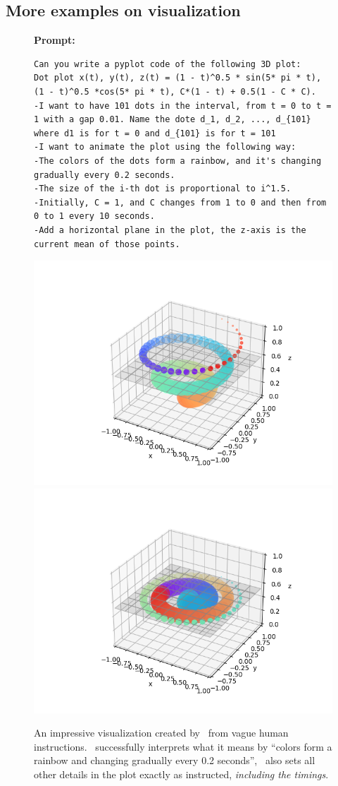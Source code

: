 \subsection{More examples on visualization}
\begin{figure}[H]
\begin{AIbox}{\DV}
{\bf Prompt:} \begin{verbatim}
Can you write a pyplot code of the following 3D plot:
Dot plot x(t), y(t), z(t) = (1 - t)^0.5 * sin(5* pi * t), (1 - t)^0.5 *cos(5* pi * t), C*(1 - t) + 0.5(1 - C * C).
-I want to have 101 dots in the interval, from t = 0 to t = 1 with a gap 0.01. Name the dote d_1, d_2, ..., d_{101} where d1 is for t = 0 and d_{101} is for t = 101
-I want to animate the plot using the following way:
-The colors of the dots form a rainbow, and it's changing gradually every 0.2 seconds.
-The size of the i-th dot is proportional to i^1.5.
-Initially, C = 1, and C changes from 1 to 0 and then from 0 to 1 every 10 seconds.
-Add a horizontal plane in the plot, the z-axis is the current mean of those points.
\end{verbatim}
\vspace{-0.3cm}
\includegraphics[trim={0 0 4cm 0}, width=0.4\linewidth]{figures/p4.png}\includegraphics[trim={0 0 4cm 0}, width=0.4\linewidth]{figures/p3.png}
\end{AIbox}
\caption{An impressive visualization created by \DV \ from vague human instructions. \DV \ successfully interprets what it means by ``colors form a rainbow and changing gradually every 0.2 seconds'', \DV \ also sets all other details in the plot exactly as instructed, \emph{including the timings}.}
\label{fig:plot-2}
\end{figure}

